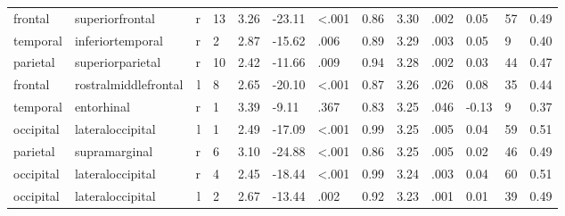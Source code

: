 \documentclass{article}
\begin{document}
\begin{longtable}{llrR{1.3cm}R{1cm}R{1.3cm}R{1cm}R{1cm}R{1.3cm}R{1cm}R{1.8cm}R{1.3cm}R{1.8cm}}
   frontal &           superiorfrontal &    r &        13 &                  3.26 &           -23.11 &      \textless.001 &                               0.86 &                          3.30 &                            .002 &   0.05 &     57 &      0.49 \\
  temporal &          inferiortemporal &    r &         2 &                  2.87 &           -15.62 &               .006 &                               0.89 &                          3.29 &                            .003 &   0.05 &      9 &      0.40 \\
  parietal &          superiorparietal &    r &        10 &                  2.42 &           -11.66 &               .009 &                               0.94 &                          3.28 &                            .002 &   0.03 &     44 &      0.47 \\
   frontal &      rostralmiddlefrontal &    l &         8 &                  2.65 &           -20.10 &      \textless.001 &                               0.87 &                          3.26 &                            .026 &   0.08 &     35 &      0.44 \\
  temporal &                entorhinal &    r &         1 &                  3.39 &            -9.11 &               .367 &                               0.83 &                          3.25 &                            .046 &  -0.13 &      9 &      0.37 \\
 occipital &          lateraloccipital &    l &         1 &                  2.49 &           -17.09 &      \textless.001 &                               0.99 &                          3.25 &                            .005 &   0.04 &     59 &      0.51 \\
  parietal &             supramarginal &    r &         6 &                  3.10 &           -24.88 &      \textless.001 &                               0.86 &                          3.25 &                            .005 &   0.02 &     46 &      0.49 \\
 occipital &          lateraloccipital &    r &         4 &                  2.45 &           -18.44 &      \textless.001 &                               0.99 &                          3.24 &                            .003 &   0.04 &     60 &      0.51 \\
 occipital &          lateraloccipital &    l &         2 &                  2.67 &           -13.44 &               .002 &                               0.92 &                          3.23 &                            .001 &   0.01 &     39 &      0.49 \\

\end{longtable}
\end{document}
